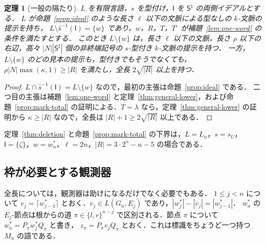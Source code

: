 \documentclass[11pt,a4paper]{ltjsarticle}
\numberwithin{equation}{section}
\theoremstyle{plain}
\newtheorem{theorem}{定理}[section]
\theoremstyle{definition}
\theoremstyle{remark}
\theoremstyle{plain}
\newcommand{\eps}{\lambda}
\newcommand{\Lce}{\lceil}
\newcommand{\Rce}{\rceil}
\begin{document}
\begin{theorem}[一般の隔たり]\label{thm:general-gap}
$L$ を有限言語，$s$ を型付け，$\mathsf I$ を $\mathsf S^\sharp$ の両側イデアルとする．
$L$ が命題~\ref{prop:ideal} のような長さ $\ell$ 以下の文脈による型なしの $k$-文脈の提示を持ち，
$L\setminus\widehat s^{-1}(\mathsf I)=\{w\}$ であり，$w$，$R$，$T$，$T^\circ$ が補題~\ref{lem:one-word} の条件を満たすとする．
このとき $L\setminus\{w\}$ は，長さ $\ell$ 以下の文脈，長さ $\rho$ 以下の右辺，高々 $|N||\mathsf S^\sharp|$ 個の非終端記号の $s$-型付き $k$-文脈の提示を持つ．
一方，$L\setminus\{w\}$ のどの見本の提示も，型付きでもそうでなくても，$\rho|N|\max(\kappa,1)\ge|R|$ を満たし，全長 $2\sqrt{|R|}$ 以上を持つ．
\end{theorem}
\begin{proof}
$L\cap\widehat s^{-1}(\mathsf I)=L\setminus\{w\}$ なので，最初の主張は命題~\ref{prop:ideal} である．
二つ目の主張は補題~\ref{lem:one-word} と定理~\ref{thm:general-lower}，および命題~\ref{prop:mark-total} の証明による．$T=\eps$ なら，定理~\ref{thm:general-lower} の証明から $\kappa\ge|R|$ なので，全長は $|R|+1\ge2\sqrt{|R|}$ 以上である．
\end{proof}
定理~\ref{thm:deletion} と命題~\ref{prop:mark-total} の下界は，$L=L_n$，$s=s_U$，$\mathsf I=\{\zeta\}$，$w=w^*_n$，$\ell=2n$，$|R|=3\cdot2^n-n-5$ の場合である．

\subsection*{枠が必要とする観測器}
全長については，観測器は助けになるだけでなく必要でもある．
$1\le j<n$ について $v_j=\Lce w^*_{j-1}\Rce$ とおく．$v_j\in L(G_n,E_j)$ であり，$|w^*_j|-|v_j|=|w^*_{j-1}|$．
$w^*_n$ の $E_j$-節点は根からの道 $\pi\in\{l,r\}^{n-j}$ で区別される．節点 $\pi$ について $w^*_n=P_\pi w^*_jQ_\pi$ と書き，
$z_\pi=P_\pi v_jQ_\pi$ とおく．これは標識をちょうど一つ持つ $M_n$ の語である．
\end{document}
